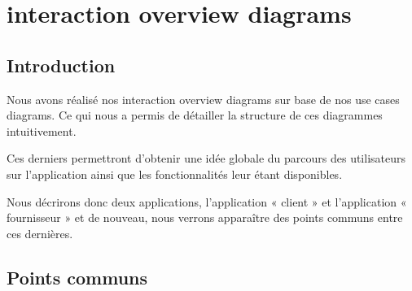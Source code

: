 \section{interaction overview diagrams}

\subsection{Introduction}

\begin{flushleft}
Nous avons réalisé nos interaction overview diagrams sur base de nos use cases diagrams. 
Ce qui nous a permis de détailler la structure de ces diagrammes intuitivement.
\end{flushleft}

\begin{flushleft}
Ces derniers permettront d’obtenir une idée globale du parcours des utilisateurs sur l’application ainsi que les fonctionnalités leur étant disponibles.
\end{flushleft}

\begin{flushleft}
Nous décrirons donc deux applications, l’application « client » et l’application « fournisseur » et de nouveau, nous verrons apparaître des points communs entre ces dernières.
\end{flushleft}

\newpage
\subsection{Points communs}

